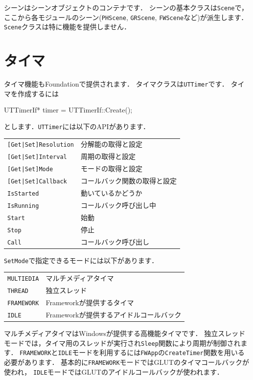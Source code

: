 \KLUDGE シーンはシーンオブジェクトのコンテナです．
\KLUDGE シーンの基本クラスは\texttt{Scene}で，ここから各モジュールのシーン(\texttt{PHScene}, \texttt{GRScene}, \texttt{FWScene}など)が派生します．
\texttt{Scene}クラスは特に機能を提供しません．


\section{タイマ}
\label{sec_uttimer}

\KLUDGE タイマ機能もFoundationで提供されます．
\KLUDGE タイマクラスは\texttt{UTTimer}です．
\KLUDGE タイマを作成するには
\begin{sourcecode}
UTTimerIf* timer = UTTimerIf::Create();
\end{sourcecode}
\KLUDGE とします．\texttt{UTTimer}には以下のAPIがあります．
\begin{center}
\begin{tabular}{ll}
\texttt{[Get|Set]Resolution}		& 分解能の取得と設定	\\
\texttt{[Get|Set]Interval}			& 周期の取得と設定		\\
\texttt{[Get|Set]Mode}				& モードの取得と設定	\\
\texttt{[Get|Set]Callback}			& コールバック関数の取得と設定 \\
\texttt{IsStarted}					& 動いているかどうか	\\
\texttt{IsRunning}					& コールバック呼び出し中 \\
\texttt{Start}						& 始動	\\
\texttt{Stop}						& 停止	\\
\texttt{Call}						& コールバック呼び出し
\end{tabular}
\end{center}
\texttt{SetMode}で指定できるモードには以下があります．
\begin{center}
\begin{tabular}{ll}
\texttt{MULTIEDIA}		& マルチメディアタイマ			\\
\texttt{THREAD}		& 独立スレッド					\\
\texttt{FRAMEWORK}		& Frameworkが提供するタイマ		\\
\texttt{IDLE}			& Frameworkが提供するアイドルコールバック
\end{tabular}
\end{center}
\KLUDGE マルチメディアタイマはWindowsが提供する高機能タイマです．
\KLUDGE 独立スレッドモードでは，タイマ用のスレッドが実行され\texttt{Sleep}関数により周期が制御されます．
\texttt{FRAMEWORK}と\texttt{IDLE}モードを利用するには\texttt{FWApp}の\texttt{CreateTimer}関数を用いる必要があります．
\KLUDGE 基本的に\texttt{FRAMEWORK}モードではGLUTのタイマコールバックが使われ，
\texttt{IDLE}モードではGLUTのアイドルコールバックが使われます．

